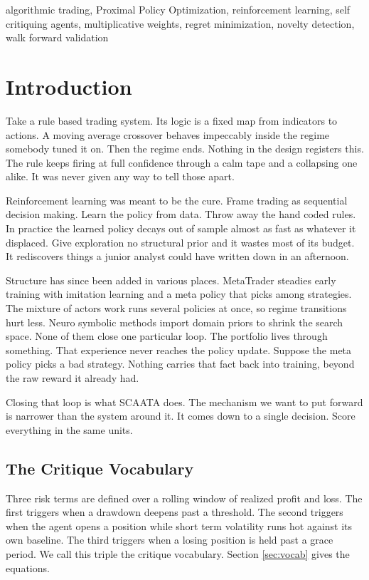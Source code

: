 \documentclass[conference]{IEEEtran}
\begin{document}
\begin{IEEEkeywords}
algorithmic trading, Proximal Policy Optimization, reinforcement learning, self critiquing agents, multiplicative weights, regret minimization, novelty detection, walk forward validation
\end{IEEEkeywords}

\section{Introduction}

Take a rule based trading system. Its logic is a fixed map from indicators to actions. A moving average crossover behaves impeccably inside the regime somebody tuned it on. Then the regime ends. Nothing in the design registers this. The rule keeps firing at full confidence through a calm tape and a collapsing one alike. It was never given any way to tell those apart.

Reinforcement learning was meant to be the cure. Frame trading as sequential decision making. Learn the policy from data. Throw away the hand coded rules. In practice the learned policy decays out of sample almost as fast as whatever it displaced. Give exploration no structural prior and it wastes most of its budget. It rediscovers things a junior analyst could have written down in an afternoon.

Structure has since been added in various places. MetaTrader \cite{niu2022metatrader} steadies early training with imitation learning and a meta policy that picks among strategies. The mixture of actors work \cite{cheng2024mot} runs several policies at once, so regime transitions hurt less. Neuro symbolic methods \cite{harini2023neurosymbolic} import domain priors to shrink the search space. None of them close one particular loop. The portfolio lives through something. That experience never reaches the policy update. Suppose the meta policy picks a bad strategy. Nothing carries that fact back into training, beyond the raw reward it already had.

Closing that loop is what SCAATA does. The mechanism we want to put forward is narrower than the system around it. It comes down to a single decision. Score everything in the same units.

\subsection{The Critique Vocabulary}

Three risk terms are defined over a rolling window of realized profit and loss. The first triggers when a drawdown deepens past a threshold. The second triggers when the agent opens a position while short term volatility runs hot against its own baseline. The third triggers when a losing position is held past a grace period. We call this triple the critique vocabulary. Section \ref{sec:vocab} gives the equations.
\end{document}
